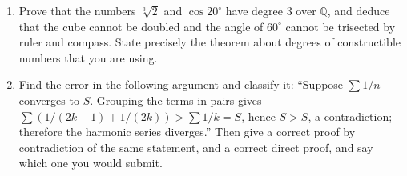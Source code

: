 \documentclass[11pt,a4paper]{article}
\begin{document}
\begin{enumerate}[itemsep=0.4em,topsep=7.4pt]
\item Prove that the numbers $\sqrt[3]2$ and $\cos20^\circ$ have degree $3$ over $\mathbb Q$, and
deduce that the cube cannot be doubled and the angle of $60^\circ$ cannot be trisected by ruler
and compass. State precisely the theorem about degrees of constructible numbers that you are
using.

\item Find the error in the following argument and classify it: ``Suppose $\sum1/n$ converges to
$S$. Grouping the terms in pairs gives $\sum(1/(2k-1)+1/(2k))>\sum1/k=S$, hence $S>S$,
a contradiction; therefore the harmonic series diverges.'' Then give a correct proof by
contradiction of the same statement, and a correct direct proof, and say which one you would
submit.
\end{enumerate}
\end{document}
